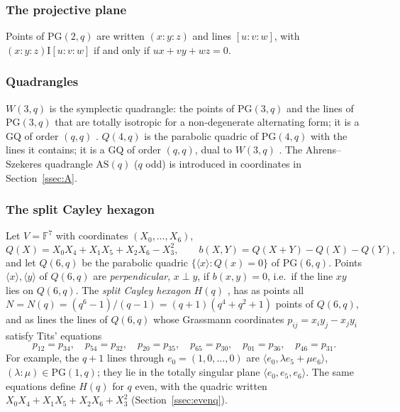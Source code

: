 \documentclass[11pt]{amsart}
\theoremstyle{definition}
\theoremstyle{remark}
\numberwithin{equation}{section}
\newcommand{\F}{\mathbb F}
\newcommand{\PG}{\mathrm{PG}}
\newcommand{\AS}{\mathrm{AS}}
\newcommand{\I}{\mathrel{\mathrm I}}
\begin{document}
\subsubsection*{The projective plane}
Points of $\PG(2,q)$ are written $(x:y:z)$ and lines $[u:v:w]$, with $(x:y:z)\I[u:v:w]$ if and only if $ux+vy+wz=0$.

\subsubsection*{Quadrangles}
$W(3,q)$ is the symplectic quadrangle: the points of $\PG(3,q)$ and the lines of $\PG(3,q)$ that are totally isotropic
for a non-degenerate alternating form; it is a GQ of order $(q,q)$ \cite{PT}. $Q(4,q)$ is the parabolic quadric of
$\PG(4,q)$ with the lines it contains; it is a GQ of order $(q,q)$, dual to $W(3,q)$ \cite[3.2.1]{PT}. The
Ahrens--Szekeres quadrangle $\AS(q)$ ($q$ odd) is introduced in coordinates in Section~\ref{ssec:A}.

\subsubsection*{The split Cayley hexagon}\label{ssec:Hq}
Let $V=\F^7$ with coordinates $(X_0,\dots,X_6)$,
\[
Q(X)=X_0X_4+X_1X_5+X_2X_6-X_3^2,\qquad b(X,Y)=Q(X+Y)-Q(X)-Q(Y),
\]
and let $Q(6,q)$ be the parabolic quadric $\{\langle x\rangle:Q(x)=0\}$ of $\PG(6,q)$. Points $\langle x\rangle,\langle
y\rangle$ of $Q(6,q)$ are \emph{perpendicular}, $x\perp y$, if $b(x,y)=0$, i.e.\ if the line $xy$ lies on $Q(6,q)$. The
\emph{split Cayley hexagon} $H(q)$ \cite{T59}, \cite[\S2.4]{VM98} has as points all
$N=N(q)=(q^6-1)/(q-1)=(q+1)(q^4+q^2+1)$ points of $Q(6,q)$, and as lines the lines of $Q(6,q)$ whose Grassmann
coordinates $p_{ij}=x_iy_j-x_jy_i$ satisfy Tits' equations
\begin{equation}\label{eq:tits}
p_{12}=p_{34},\quad p_{54}=p_{32},\quad p_{20}=p_{35},\quad p_{65}=p_{30},\quad p_{01}=p_{36},\quad p_{46}=p_{31}.
\end{equation}
For example, the $q+1$ lines through $e_0=(1,0,\dots,0)$ are $\langle e_0,\lambda e_5+\mu e_6\rangle$,
$(\lambda:\mu)\in\PG(1,q)$; they lie in the totally singular plane $\langle e_0,e_5,e_6\rangle$. The same equations
define $H(q)$ for $q$ even, with the quadric written $X_0X_4+X_1X_5+X_2X_6+X_3^2$ (Section~\ref{ssec:evenq}).
\end{document}
